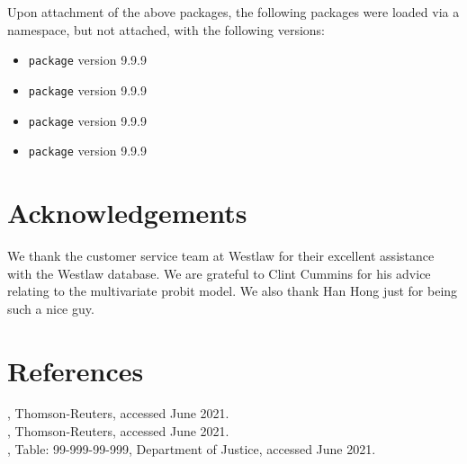\documentclass[11pt]{paper}
\begin{document}
Upon attachment of the above packages, 
the following packages were loaded via a namespace, but not attached,
with the following versions:

\begin{itemize}

\item \texttt{package} version 9.9.9
\item \texttt{package} version 9.9.9
\item \texttt{package} version 9.9.9
\item \texttt{package} version 9.9.9

\end{itemize}


\section*{Acknowledgements}


We thank the customer service team at Westlaw 
for their excellent assistance with the Westlaw database.
We are grateful to Clint Cummins for his advice relating to the multivariate probit model.
We also thank Han Hong just for being such a nice guy. 

\section*{References}

, 
  Thomson-Reuters, accessed June 2021. \\

, 
  Thomson-Reuters, accessed June 2021. \\

, Table: 99-999-99-999, 
    Department of Justice, accessed June 2021. \\
\end{document}

